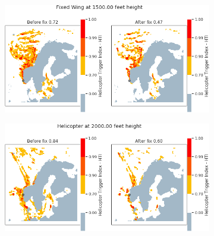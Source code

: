 \begin{figure}[H]
    \begin{subfigure}{0.45\textwidth}
    \centering
    \includegraphics[width=\textwidth]{Figures/23.png}
    \caption{}
    \label{fig:HTI23}
    \end{subfigure}
\hfill
    \begin{subfigure}{0.45\textwidth}
    \centering
    \includegraphics[width=\textwidth]{Figures/24.png}
    \caption{}
    \label{fig:HTI24}
    \end{subfigure}


\end{figure}
